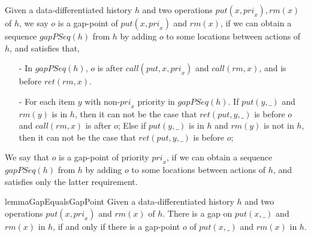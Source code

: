 \documentclass{llncs}
\begin{document}
\begin{definition}\label{def:gap-point for matched put and rm operations}

Given a data-differentiated history $h$ and two operations $\textit{put}(x,\textit{pri}_x),\textit{rm}(x)$ of $h$, we say $o$ is a gap-point of $\textit{put}(x,\textit{pri}_x)$ and $\textit{rm}(x)$, if we can obtain a sequence $\textit{gapPSeq}(h)$ from $h$ by adding $o$ to some locations between actions of $h$, and satisfies that,

\begin{itemize}
\setlength{\itemsep}{0.5pt}
\item[-] In $\textit{gapPSeq}(h)$, $o$ is after $\textit{call}(\textit{put},x,\textit{pri}_x)$ and $\textit{call}(\textit{rm},x)$, and is before $\textit{ret}(\textit{rm},x)$.
\item[-] For each item $y$ with non-$\textit{pri}_x$ priority in $\textit{gapPSeq}(h)$. If $\textit{put}(y,\_)$ and $\textit{rm}(y)$ is in $h$, then it can not be the case that $\textit{ret}(\textit{put},y,\_)$ is before $o$ and $\textit{call}(\textit{rm},x)$ is after $o$; Else if $\textit{put}(y,\_)$ is in $h$ and $\textit{rm}(y)$ is not in $h$, then it can not be the case that $\textit{ret}(\textit{put},y,\_)$ is before $o$;
\end{itemize}

We say that $o$ is a gap-point of priority $\textit{pri}_x$, if we can obtain a sequence $\textit{gapPSeq}(h)$ from $h$ by adding $o$ to some locations between actions of $h$, and satisfies only the latter requirement.
\end{definition}




\begin{restatable}{lemma}{GapEqualsGapPoint}
\label{lemma:gap eqals the existence of gap point}
Given a data-differentiated history $h$ and two operations $\textit{put}(x,\textit{pri}_x)$ and $\textit{rm}(x)$ of $h$. There is a gap on $\textit{put}(x,\_)$ and $\textit{rm}(x)$ in $h$, if and only if there is a gap-point $o$ of $\textit{put}(x,\_)$ and $\textit{rm}(x)$ in $h$.
\end{restatable}
\end{document}
